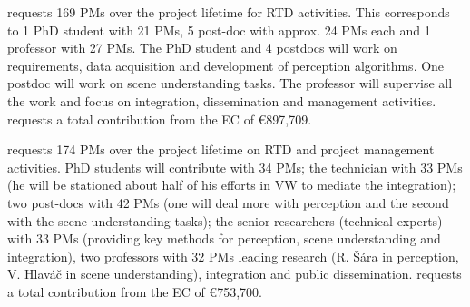 \CLUJ requests 169 PMs over the project lifetime for RTD activities. This
corresponds to 1 PhD student with 21 PMs, 5 post-doc with approx. 24 PMs
each and 1 professor with 27 PMs. The PhD student and 4 postdocs will
work on requirements, data acquisition and development of perception
algorithms. One postdoc will work on scene understanding tasks. The
professor will supervise all the work and focus on integration,
dissemination and management activities. \CLUJ requests a total contribution from the EC of \euro 897,709.

{\cbl \PRAGUE requests 174 PMs over the project lifetime on RTD and project management activities. PhD students will contribute with 34 PMs; the technician with 33 PMs (he will be stationed about half of his efforts in VW to mediate the integration); two post-docs with 42 PMs (one will deal more with perception and the second with the scene understanding tasks); the senior researchers (technical experts) with 33 PMs (providing key methods for perception, scene understanding and integration), two professors with 32 PMs leading research (R. \v{S}\' ara in perception, V. Hlav\' a\v{c} in scene understanding), integration and public dissemination. \PRAGUE requests a total contribution from the EC of \euro 753,700.} 